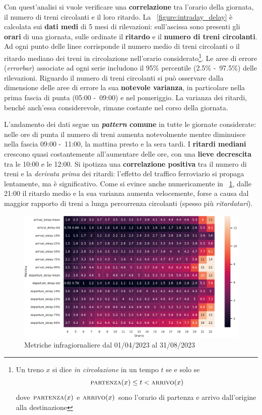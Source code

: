 \documentclass[12pt,a4paper,italian]{report}
\begin{document}
Con quest'analisi si vuole verificare una \textbf{correlazione} tra
l'orario della giornata, il numero di treni circolanti e il loro
ritardo.  La \figurename~\ref{figure:intraday_delay} è calcolata sui
\textbf{dati medi} di 5 mesi di rilevazioni: sull'ascissa sono
presenti gli \textbf{orari} di una giornata, sulle ordinate il
\textbf{ritardo} e il \textbf{numero di treni circolanti}.  Ad ogni
punto delle linee corrisponde il numero medio di treni circolanti o il
ritardo mediano dei treni in circolazione nell'orario
considerato\footnote{Un treno $x$ si dice \textit{in circolazione} in
    un tempo $t$ se e solo se
    $$\textsc{partenza}(x) \leq t <
    \textsc{arrivo}(x)$$ dove $\textsc{partenza}(x)$ e
    $\textsc{arrivo}(x)$ sono l'orario di partenza e arrivo
    dall'origine alla destinazione}.  Le aree di errore
(\textit{errorbar}) associate ad ogni serie includono il 95\%
percentile (2.5\% -~97.5\%) delle rilevazioni.  Riguardo il numero di
treni circolanti si può osservare dalla dimensione delle aree di
errore la sua \textbf{notevole varianza}, in particolare nella prima
fascia di punta (05:00 -~09:00) e nel pomeriggio.  La varianza dei
ritardi, benché anch'essa considerevole, rimane costante nel corso
della giornata.

L'andamento dei dati segue un \textbf{\textit{pattern} comune} in
tutte le giornate considerate: nelle ore di punta il numero di treni
aumenta notevolmente mentre diminuisce nella fascia 09:00 -~11:00, la
mattina presto e la sera tardi.  I \textbf{ritardi mediani} crescono
quasi costantemente all'aumentare delle ore, con una \textbf{lieve
    decrescita} tra le 10:00 e le 12:00.  Si ipotizza una
\textbf{correlazione positiva} tra il numero di treni e la
\textit{derivata prima} dei ritardi: l'effetto del traffico
ferroviario si propaga lentamente, ma è significativo.  Come si evince
anche numericamente in \figurename~\ref{figure:intraday_metrics},
dalle 21:00 il ritardo medio e la sua varianza aumenta velocemente,
forse a causa dal maggior rapporto di treni a lunga percorrenza
circolanti (spesso più \textit{ritardatari}).

\begin{figure}[h]
    \includegraphics[width=1\textwidth]{images/intraday_metrics.pdf}
    \caption{Metriche infragiornaliere dal 01/04/2023 al
        31/08/2023~}
    \label{figure:intraday_metrics}
\end{figure}
\end{document}
